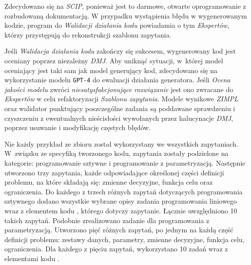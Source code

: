  Zdecydowano się na \textit{SCIP}, ponieważ jest to darmowe, otwarte oprogramowanie z rozbudowaną dokumentacją. %
 W przypadku wystąpienia błędu w wygenerowanym kodzie, program do \textit{Walidacji działania kodu} powiadamia o tym \textit{Ekspertów}, którzy przystępują do rekonstrukcji szablonu zapytania.

Jeśli \textit{Walidacja działania kodu} zakończy się sukcesem, wygenerowany kod jest oceniany poprzez niezależny \textit{DMJ}. Aby uniknąć sytuacji, w~której model oceniający jest taki sam jak model generujący kod, zdecydowano się na wykorzystanie modelu \texttt{GPT-4} do ewaluacji działania generatora. Jeśli \textit{Ocena jakości modelu} zwróci \textit{niesatysfakcjonujące rozwiązanie} jest ono zwracane do \textit{Ekspertów} w celu refaktoryzacji \textit{Szablonu zapytania}. Modele wynikowe \textit{ZIMPL} oraz walidator punktujący poszczególne zadania są poddawane sprawdzeniu i czyszczeniu z ewentualnych nieścisłości wywołanych przez halucynacje \textit{DMJ}, poprzez usuwanie i modyfikację częstych błędów.


Nie każdy przykład ze zbioru został wykorzystany we wszystkich zapytaniach. W~związku ze specyfiką tworzonego kodu, zapytania zostały podzielone na kategorie: programowanie sztywne i programowanie z parametryzacją. Następnie utworzono trzy zapytania, każde odpowiadające określonej części definicji problemu, na które składają się: zmienne decyzyjne, funkcja celu oraz ograniczenia. Do każdego z trzech różnych zapytań dotyczących programowania sztywnego %
dodano wszystkie wybrane opisy zadania programowania liniowego
wraz z elementem kodu  , którego dotyczy zapytanie. Łącznie uwzględniono 10 takich zapytań. Podobnie zrealizowano zadanie dla programowania z parametryzacją. Utworzono pięć różnych zapytań, po jednym na każdą część definicji problemu: zestawy danych, parametry, zmienne decyzyjne, funkcja celu, ograniczenia. Dla każdego z pięciu zapytań, wykorzystano 10 zadań wraz z elementami kodu  . %


